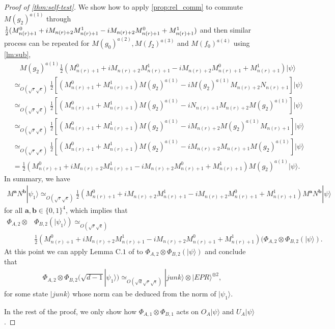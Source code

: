 \documentclass[11pt,letterpaper]{article}
\newcommand{\ket}[1]{|#1\rangle}
\newcommand{\x}{\otimes}
\newcommand{\1}{\mathbb{1}}
\newcommand{\nr}{n(r)}
\newcommand{\ba}{\pmb{a}}
\newcommand{\bb}{\pmb{b}}
\newcommand{\se}{\sqrt{\epsilon}}
\newcommand{\sd}{\sqrt{d}}
\newcommand{\sr}{\sqrt{r}}
\newcommand{\appd}[1]{\simeq_{#1}}
\theoremstyle{definition}
\begin{document}
\begin{proof}[Proof of \cref{thm:self-test}]
We show how to apply \cref{prop:rel_comm} to commute $M(g_2)^{a(1)}$ through 
$\frac{1}{2} (M_{\nr+1}^0 + iM_{\nr+2}M_{\nr+1}^1 \\- iM_{\nr+2}M_{\nr+1}^0 + M_{\nr+1}^1)$ and then similar process can be repeated for $M(g_0)^{a(2)}, M(f_2)^{a(3)}$ and $M(f_0)^{a(4)}$ using
\cref{lm:sub},
\begin{align*}
	&\quad M(g_2)^{a(1)} \frac{1}{2} (M_{\nr+1}^0 + iM_{\nr+2}M_{\nr+1}^1 - iM_{\nr+2}M_{\nr+1}^0 + M_{\nr+1}^1) \ket{\psi} \\
	&\appd{O(\sr\se)} \frac{1}{2}[ (M_{\nr+1}^0+M_{\nr+1}^1) M(g_2)^{a(1)} -i M(g_2)^{a(1)} M_{\nr+2}N_{\nr+1}] \ket{\psi} \\
	&\appd{O(\sr\se)} \frac{1}{2} [(M_{\nr+1}^0+M_{\nr+1}^1) M(g_2)^{a(1)} - iN_{\nr+1} M_{\nr+2}M(g_2)^{a(1)} ] \ket{\psi} \\
	&\appd{O(\sr\se)}\frac{1}{2} [(M_{\nr+1}^0+M_{\nr+1}^1) M(g_2)^{a(1)} - iM_{\nr+2}M(g_2)^{a(1)} M_{\nr+1}] \ket{\psi} \\
	&\appd{O(\sr\se)}\frac{1}{2} [(M_{\nr+1}^0+M_{\nr+1}^1) M(g_2)^{a(1)} - iM_{\nr+2}M_{\nr+1}M(g_2)^{a(1)} ] \ket{\psi}\\
	&= \frac{1}{2} (M_{\nr+1}^0 + iM_{\nr+2}M_{\nr+1}^1 - iM_{\nr+2}M_{\nr+1}^0 + M_{\nr+1}^1)M(g_2)^{a(1)}\ket{\psi}.
\end{align*}
In summary, we have 
\begin{align}
	M^{\ba} N^{\bb} \ket{\psi_1} \appd{O(\sr\se)} \frac{1}{2} (M_{\nr+1}^0 + iM_{\nr+2}M_{\nr+1}^1 - iM_{\nr+2}M_{\nr+1}^0 + M_{\nr+1}^1)M^{\ba}N^{\bb} \ket{\psi}
\end{align}
for all $\ba, \bb \in \{0,1\}^4$, which implies that 
\begin{align*}
	\Phi_{A,2} \x& \Phi_{B,2}(\ket{\psi_1}) \appd{O(\sr\se)}\\
	 &\frac{1}{2} (M_{\nr+1}^0 + iM_{\nr+2}M_{\nr+1}^1 - iM_{\nr+2}M_{\nr+1}^0 + M_{\nr+1}^1)(\Phi_{A,2}\x\Phi_{B,2} (\ket{\psi}).
\end{align*}
At this point we can apply Lemma C.$1$ of \cite{wu2016} to $\Phi_{A,2}\x\Phi_{B,2} (\ket{\psi})$ and conclude that 
\begin{align}
	\Phi_{A,2} \x \Phi_{B,2}(\sqrt{d-1} \ket{\psi_1}) \appd{O(\sd \sr \se)} \ket{junk} \x \ket{EPR}^{\x 2},
\end{align} 
for some state $\ket{junk}$ whose norm can be deduced from the norm of $\ket{\psi_1}$.

In the rest of the proof, we only show how $\Phi_{A,1} \x \Phi_{B,1}$ acts on $O_A\ket{\psi}$ and $U_A\ket{\psi}$.


\end{proof}
\end{document}
